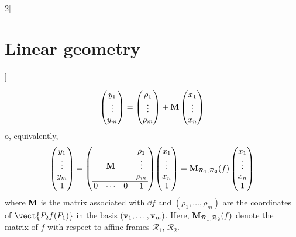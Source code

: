 \documentclass[../../../main.tex]{subfiles}
\begin{document}
\begin{multicols}{2}[\section{Linear geometry}]
\begin{prop}
    $$
      \begin{pmatrix}
        y_1    \\
        \vdots \\
        y_m    \\
      \end{pmatrix}
      =
      \begin{pmatrix}
        \rho_1 \\
        \vdots \\
        \rho_m \\
      \end{pmatrix}
      +\boldsymbol{\mathrm{M}}
      \begin{pmatrix}
        x_1    \\
        \vdots \\
        x_n    \\
      \end{pmatrix}$$
    o, equivalently,
    $$
      \begin{pmatrix}
        y_1    \\
        \vdots \\
        y_m    \\
        1      \\
      \end{pmatrix}
      =\left(
      \begin{array}{@{\,}ccc|c@{\,}}
            &                    &   & \rho_1 \\
            & \vectorfunction{M} &   & \vdots \\
            &                    &   & \rho_m \\
          \hline
          0 & \cdots             & 0 & 1
        \end{array}\right)\!
      \begin{pmatrix}
        x_1    \\
        \vdots \\
        x_n    \\
        1      \\
      \end{pmatrix}
      =\vectorfunction{M}_{\mathcal{R}_1,\mathcal{R}_2}(f)
      \begin{pmatrix}
        x_1    \\
        \vdots \\
        x_n    \\
        1      \\
      \end{pmatrix}$$
    where $\boldsymbol{\mathrm{M}}$ is the matrix associated with $\dd f$ and $(\rho_1,\ldots,\rho_m)$ are the coordinates of $\vect{P_2f(P_1)}$ in the basis $(\boldsymbol{\mathrm{v}}_1,\ldots,\boldsymbol{\mathrm{v}}_m)$. Here, $\boldsymbol{\mathrm{M}}_{\mathcal{R}_1,\mathcal{R}_2}(f)$ denote the matrix of $f$ with respect to affine frames $\mathcal{R}_1$, $\mathcal{R}_2$.
  \end{prop}

\end{multicols}
\end{document}
